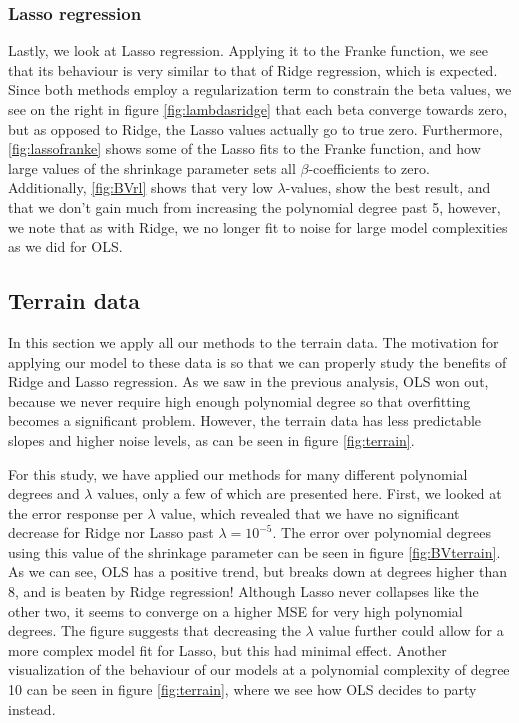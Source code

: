 \documentclass[a4paper, twocolumn]{article}
\begin{document}
\subsubsection{Lasso regression}
Lastly, we look at Lasso regression. Applying it to the Franke function, we see that its behaviour is very similar to that of Ridge regression, which is expected. Since both methods employ a regularization term to constrain the beta values, we see on the right in figure \ref{fig:lambdasridge} that each beta converge towards zero, but as opposed to Ridge, the Lasso values actually go to true zero. Furthermore, \ref{fig:lassofranke} shows some of the Lasso fits to the Franke function, and how large values of the shrinkage parameter sets all $\beta$-coefficients to zero. Additionally, \ref{fig:BVrl} shows that very low $\lambda$-values, show the best result, and that we don't gain much from increasing the polynomial degree past 5, however, we note that as with Ridge, we no longer fit to noise for large model complexities as we did for OLS.

\subsection{Terrain data}
In this section we apply all our methods to the terrain data. The motivation for applying our model to these data is so that we can properly study the benefits of Ridge and Lasso regression. As we saw in the previous analysis, OLS won out, because we never require high enough polynomial degree so that overfitting becomes a significant problem. However, the terrain data has less predictable slopes and higher noise levels, as can be seen in figure \ref{fig:terrain}.

For this study, we have applied our methods for many different polynomial degrees and $\lambda$ values, only a few of which are presented here.
First, we looked at the error response per $\lambda$ value, which revealed that we have no significant decrease for Ridge nor Lasso past $\lambda=10^{-5}$. The error over polynomial degrees using this value of the shrinkage parameter can be seen in figure \ref{fig:BVterrain}. As we can see, OLS has a positive trend, but breaks down at degrees higher than 8, and is beaten by Ridge regression! Although Lasso never collapses like the other two, it seems to converge on a higher MSE for very high polynomial degrees. The figure suggests that decreasing the $\lambda$ value further could allow for a more complex model fit for Lasso, but this had minimal effect. Another visualization of the behaviour of our models at a polynomial complexity of degree 10 can be seen in figure \ref{fig:terrain}, where we see how OLS decides to party instead.
\end{document}
